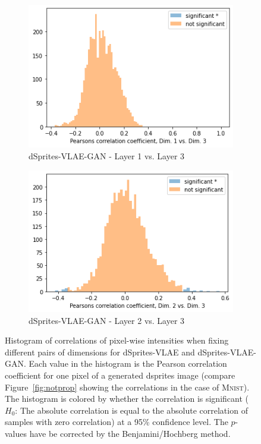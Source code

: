 \begin{figure}
\begin{subfigure}{.3\textwidth}
        \includegraphics[width=\textwidth]{images/notprop/dsprites/vlae_gan/dim_1_3.png}
        \caption{dSprites-VLAE-GAN - Layer 1 vs. Layer 3}
    \end{subfigure}
    \hfill
    \begin{subfigure}{.3\textwidth}
        \includegraphics[width=\textwidth]{images/notprop/dsprites/vlae_gan/dim_2_3.png}
        \caption{dSprites-VLAE-GAN - Layer 2 vs. Layer 3}
    \end{subfigure}
    \caption[dSprites-VLAE and dSprites-VLAE-GAN - Pixel intensity correlation]{Histogram of correlations of pixel-wise intensities when fixing different pairs of dimensions for dSprites-VLAE and dSprites-VLAE-GAN.
    Each value in the histogram is the Pearson correlation coefficient for one pixel of a generated dsprites image (compare Figure~\ref{fig:notprop} showing the correlations in the case of \textsc{Mnist}).
    The histogram is colored by whether the correlation is significant ($H_0$: The absolute correlation is equal to the absolute correlation of samples with zero correlation) at a 95\% confidence level.
    The $p$-values have be corrected by the Benjamini/Hochberg method.}
    \label{fig:dsprites_vlae_notprop}
\end{figure}

